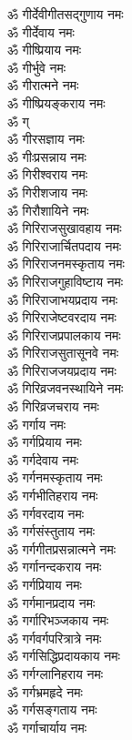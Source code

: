 \begin{multicols}{2}
\begin{flushleft}
ॐ गीर्देवीगीतसद्गुणाय नमः\\
ॐ गीर्देवाय नमः\\
ॐ गीष्प्रियाय नमः\\
ॐ गीर्भुवे नमः\\
ॐ गीरात्मने नमः\\
ॐ गीष्प्रियङ्कराय नमः\\
ॐ ग्\\
ॐ गीरसज्ञाय नमः\hfill{}\\
ॐ गीःप्रसन्नाय नमः\\
ॐ गिरीश्वराय नमः\\
ॐ गिरीशजाय नमः\\
ॐ गिरौशायिने नमः\\
ॐ गिरिराजसुखावहाय नमः\\
ॐ गिरिराजार्चितपदाय नमः\\
ॐ गिरिराजनमस्कृताय नमः\\
ॐ गिरिराजगुहाविष्टाय नमः\\
ॐ गिरिराजाभयप्रदाय नमः\\
ॐ गिरिराजेष्टवरदाय नमः\hfill{}\\
ॐ गिरिराजप्रपालकाय नमः\\
ॐ गिरिराजसुतासूनवे नमः\\
ॐ गिरिराजजयप्रदाय नमः\\
ॐ गिरिव्रजवनस्थायिने नमः\\
ॐ गिरिव्रजचराय नमः\\
ॐ गर्गाय नमः\\
ॐ गर्गप्रियाय नमः\\
ॐ गर्गदेवाय नमः\\
ॐ गर्गनमस्कृताय नमः\\
ॐ गर्गभीतिहराय नमः\hfill{}\\
ॐ गर्गवरदाय नमः\\
ॐ गर्गसंस्तुताय नमः\\
ॐ गर्गगीतप्रसन्नात्मने नमः\\
ॐ गर्गानन्दकराय नमः\\
ॐ गर्गप्रियाय नमः\\
ॐ गर्गमानप्रदाय नमः\\
ॐ गर्गारिभञ्जकाय नमः\\
ॐ गर्गवर्गपरित्रात्रे नमः\\
ॐ गर्गसिद्धिप्रदायकाय नमः\\
ॐ गर्गग्लानिहराय नमः\hfill{}\\
ॐ गर्गभ्रमहृदे नमः\\
ॐ गर्गसङ्गताय नमः\\
ॐ गर्गाचार्याय नमः\\

\end{flushleft}
\end{multicols}
